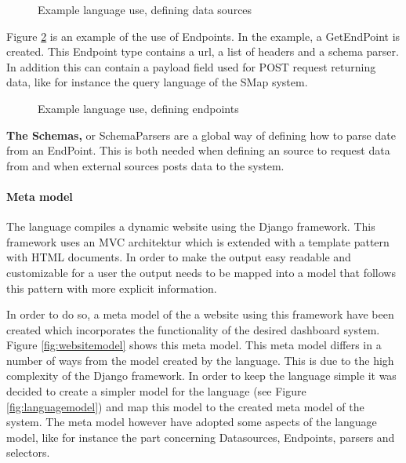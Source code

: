 \begin{figure}
\begin{center}

\end{center}
\caption{Example language use, defining data sources}
\label{fig:exampleDatasources}
\end{figure}

Figure \ref{fig:exampleEndpoints} is an example of the use of Endpoints.
In the example, a GetEndPoint is created. This Endpoint type contains a url, a list of headers
and a schema parser.
In addition this can contain a payload field used for POST request returning data, like for
instance the query language of the SMap system.
\begin{figure}
\begin{center}

\end{center}
\caption{Example language use, defining endpoints}
\label{fig:exampleEndpoints}
\end{figure}

\textbf{The Schemas,} or SchemaParsers are a global way of defining how to parse date from an
EndPoint.
This is both needed when defining an source to request data from and when external sources posts
data to the system.

\paragraph{Meta model}
The language compiles a dynamic website using the Django framework.
This framework uses an MVC architektur which is extended with a template pattern with
HTML documents. 
In order to make the output easy readable and customizable for a user the output needs to be
mapped into a model that follows this pattern with more explicit information.

In order to do so, a meta model of the a website using this framework have been created which
incorporates the functionality of the desired dashboard system.  
Figure \ref{fig:websitemodel} shows this meta model.
This meta model differs in a number of ways from the model created by the language.
This is due to the high complexity of the Django framework.
In order to keep the language simple it was decided to create a simpler model for the language
(see Figure \ref{fig:languagemodel}) and map this model to the created meta model of the system.
The meta model however have adopted some aspects of the language model, like for instance
the part concerning Datasources, Endpoints, parsers and selectors.
 
